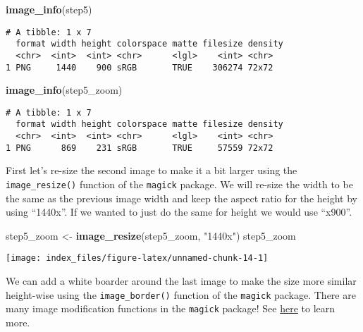 \documentclass[
]{article}
\newenvironment{Shaded}{\begin{snugshade}}{\end{snugshade}}
\newcommand{\KeywordTok}[1]{\textcolor[rgb]{0.13,0.29,0.53}{\textbf{#1}}}
\newcommand{\NormalTok}[1]{#1}
\newcommand{\StringTok}[1]{\textcolor[rgb]{0.31,0.60,0.02}{#1}}
\begin{document}
\begin{Shaded}
\begin{Highlighting}[]
\KeywordTok{image_info}\NormalTok{(step5)}
\end{Highlighting}
\end{Shaded}

\begin{verbatim}
# A tibble: 1 x 7
  format width height colorspace matte filesize density
  <chr>  <int>  <int> <chr>      <lgl>    <int> <chr>  
1 PNG     1440    900 sRGB       TRUE    306274 72x72  
\end{verbatim}

\begin{Shaded}
\begin{Highlighting}[]
\KeywordTok{image_info}\NormalTok{(step5_zoom)}
\end{Highlighting}
\end{Shaded}

\begin{verbatim}
# A tibble: 1 x 7
  format width height colorspace matte filesize density
  <chr>  <int>  <int> <chr>      <lgl>    <int> <chr>  
1 PNG      869    231 sRGB       TRUE     57559 72x72  
\end{verbatim}

First let's re-size the second image to make it a bit larger using the
\texttt{image\_resize()} function of the \texttt{magick} package. We
will re-size the width to be the same as the previous image width and
keep the aspect ratio for the height by using ``1440x''. If we wanted to
just do the same for height we would use ``x900''.

\begin{Shaded}
\begin{Highlighting}[]
\NormalTok{step5_zoom <-}\StringTok{ }\KeywordTok{image_resize}\NormalTok{(step5_zoom,  }\StringTok{"1440x"}\NormalTok{)}
\NormalTok{step5_zoom}
\end{Highlighting}
\end{Shaded}

\begin{center}\texttt{[image: index\_files/figure-latex/unnamed-chunk-14-1]} \end{center}

We can add a white boarder around the last image to make the size more
similar height-wise using the \texttt{image\_border()} function of the
\texttt{magick} package. There are many image modification functions in
the \texttt{magick} package! See
\href{https://cran.r-project.org/web/packages/magick/vignettes/intro.html}{here}
to learn more.
\end{document}
